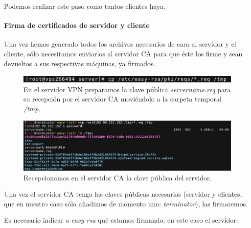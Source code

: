 \documentclass[a4paper, 11pt, titlepage]{article}
\begin{document}
            Podemos realizar este paso como tantos clientes haya.
        
            \paragraph{Firma de certificados de servidor y cliente}
        
            Una vez hemos generado todos los archivos necesarios de cara al servidor y el cliente,
            sólo necesitamos enviarlos al servidor CA para que éste los firme y sean devueltos a sus
            respectivas máquinas, ya firmados.
        
            \begin{figure}[htp]
                \centering
                \includegraphics[width=1\textwidth]{resources/ca15.png}
                \caption{En el servidor VPN preparamos la clave pública \textit{servername.req} para su
                recepción por el servidor CA moviéndolo a la carpeta temporal \textit{/tmp}.}
                \label{ca15}
            \end{figure}
            \begin{figure}[htp]
                \centering
                \includegraphics[width=1\textwidth]{resources/ca16.png}
                \caption{Recepcionamos en el servidor CA la clave pública del servidor.}
                \label{ca16}
            \end{figure}
        
            Una vez el servidor CA tenga las claves públicas necesarias (servidor y clientes, que en 
            nuestro caso sólo añadimos de momento uno: \textit{terminator}), las firmaremos.
        
            Es necesario indicar a \textit{easy-rsa} qué estamos firmando; en este caso el servidor:
        
\end{document}
